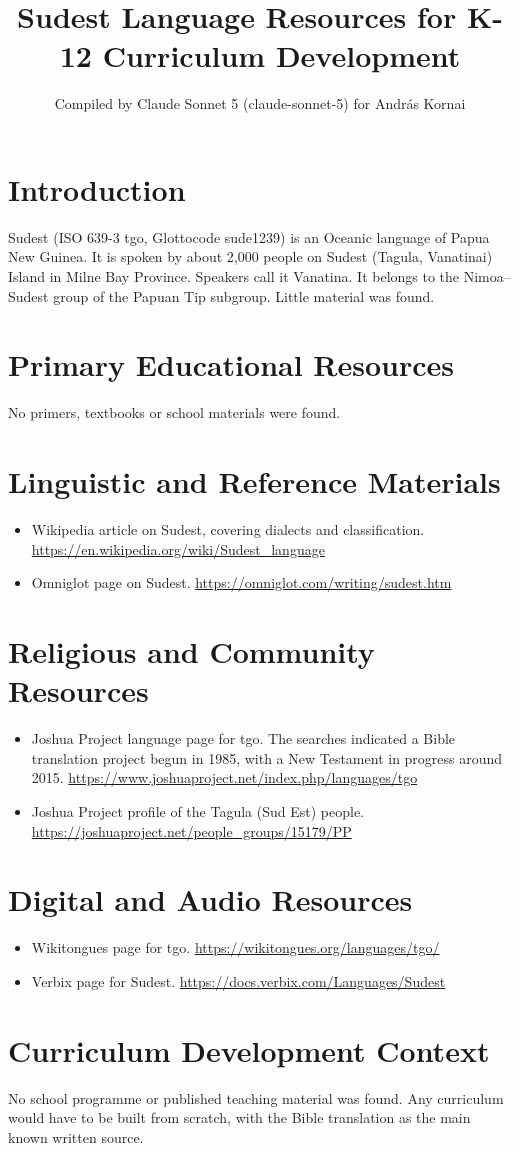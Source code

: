 \documentclass[12pt]{article}
\title{Sudest Language Resources for K-12 Curriculum Development}
\author{Compiled by Claude Sonnet 5 (claude-sonnet-5) for Andr\'as Kornai}
\date{}
\begin{document}
\maketitle
\section{Introduction}
Sudest (ISO 639-3 tgo, Glottocode sude1239) is an Oceanic language of Papua New Guinea. It is spoken by about 2,000 people on Sudest (Tagula, Vanatinai) Island in Milne Bay Province. Speakers call it Vanatina. It belongs to the Nimoa--Sudest group of the Papuan Tip subgroup. Little material was found.
\section{Primary Educational Resources}
No primers, textbooks or school materials were found.
\section{Linguistic and Reference Materials}
\begin{itemize}
\item Wikipedia article on Sudest, covering dialects and classification. \url{https://en.wikipedia.org/wiki/Sudest_language}
\item Omniglot page on Sudest. \url{https://omniglot.com/writing/sudest.htm}
\end{itemize}
\section{Religious and Community Resources}
\begin{itemize}
\item Joshua Project language page for tgo. The searches indicated a Bible translation project begun in 1985, with a New Testament in progress around 2015. \url{https://www.joshuaproject.net/index.php/languages/tgo}
\item Joshua Project profile of the Tagula (Sud Est) people. \url{https://joshuaproject.net/people_groups/15179/PP}
\end{itemize}
\section{Digital and Audio Resources}
\begin{itemize}
\item Wikitongues page for tgo. \url{https://wikitongues.org/languages/tgo/}
\item Verbix page for Sudest. \url{https://docs.verbix.com/Languages/Sudest}
\end{itemize}
\section{Curriculum Development Context}
No school programme or published teaching material was found. Any curriculum would have to be built from scratch, with the Bible translation as the main known written source.
\end{document}
